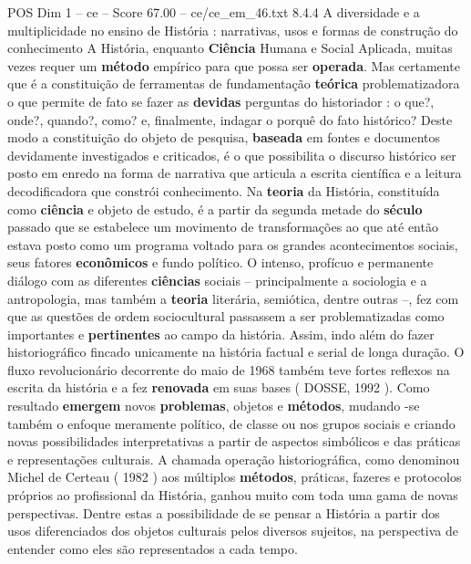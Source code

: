 \begin{textsample}{POS Dim 1 – ce – Score 67.00 – ce/ce\_em\_46.txt}  \label{ex:f1_pos_046}
8.4.4 A diversidade e a multiplicidade no ensino de História : narrativas, usos e formas de construção do conhecimento A História, enquanto \textbf{Ciência} Humana e Social Aplicada, muitas vezes requer um \textbf{método} empírico para que possa ser \textbf{operada}.
Mas certamente que é a constituição de ferramentas de fundamentação \textbf{teórica} problematizadora o que permite de fato se fazer as \textbf{devidas} perguntas do historiador : o que?, onde?, quando?, como? e, finalmente, indagar o porquê do fato histórico?
Deste modo a constituição do objeto de pesquisa, \textbf{baseada} em fontes e documentos devidamente investigados e criticados, é o que possibilita o discurso histórico ser posto em enredo na forma de narrativa que articula a escrita científica e a leitura decodificadora que constrói conhecimento.
Na \textbf{teoria} da História, constituída como \textbf{ciência} e objeto de estudo, é a partir da segunda metade do \textbf{século} passado que se estabelece um movimento de transformações ao que até então estava posto como um programa voltado para os grandes acontecimentos sociais, seus fatores \textbf{econômicos} e fundo político.
O intenso, profícuo e permanente diálogo com as diferentes \textbf{ciências} sociais – principalmente a sociologia e a antropologia, mas também a \textbf{teoria} literária, semiótica, dentre outras –, fez com que as questões de ordem sociocultural passassem a ser problematizadas como importantes e \textbf{pertinentes} ao campo da história.
Assim, indo além do fazer historiográfico fincado unicamente na história factual e serial de longa duração.
O fluxo revolucionário decorrente do maio de 1968 também teve fortes reflexos na escrita da história e a fez \textbf{renovada} em suas bases ( DOSSE, 1992 ).
Como resultado \textbf{emergem} novos \textbf{problemas}, objetos e \textbf{métodos}, mudando -se também o enfoque meramente político, de classe ou nos grupos sociais e criando novas possibilidades interpretativas a partir de aspectos simbólicos e das práticas e representações culturais.
A chamada operação historiográfica, como denominou Michel de Certeau ( 1982 ) aos múltiplos \textbf{métodos}, práticas, fazeres e protocolos próprios ao profissional da História, ganhou muito com toda uma gama de novas perspectivas.
Dentre estas a possibilidade de se pensar a História a partir dos usos diferenciados dos objetos culturais pelos diversos sujeitos, na perspectiva de entender como eles são representados a cada tempo.

\end{textsample}
